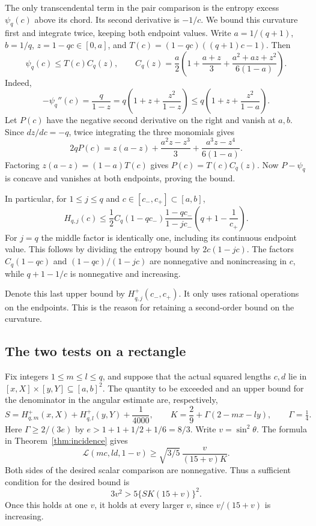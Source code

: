 \documentclass[11pt,a4paper]{article}
\theoremstyle{remark}\newtheorem{remark}[theorem]{Remark}
\numberwithin{equation}{section}
\begin{document}
The only transcendental term in the pair comparison is the entropy
excess $\psi_q(c)$ above its chord. Its second derivative is $-1/c$.
We bound this curvature first and integrate twice, keeping both
endpoint values. Write $a=1/(q+1)$, $b=1/q$,
$z=1-qc\in[0,a]$, and
$T(c)=(1-qc)((q+1)c-1)$. Then
\[
  \psi_q(c)\le T(c)C_q(z),\qquad
  C_q(z)=\frac a2\left(1+\frac{a+z}{3}
          +\frac{a^2+az+z^2}{6(1-a)}\right).
\]
Indeed,
\[
 -\psi_q''(c)=\frac{q}{1-z}
  =q\left(1+z+\frac{z^2}{1-z}\right)
  \le q\left(1+z+\frac{z^2}{1-a}\right).
\]
Let $P(c)$ have the negative second derivative on the right and vanish
at $a,b$. Since $dz/dc=-q$, twice integrating the three monomials
gives
\[
 2qP(c)=z(a-z)+\frac{a^2 z-z^3}{3}
                 +\frac{a^3z-z^4}{6(1-a)} .
\]
Factoring $z(a-z)=(1-a)T(c)$ gives $P(c)=T(c)C_q(z)$.
Now $P-\psi_q$ is concave and vanishes at both endpoints, proving the
bound.

In particular, for $1\le j\le q$ and $c\in[c_-,c_+]\subset[a,b]$,
\[
 H_{q,j}(c)\le
 \frac12 C_q(1-qc_-)
 \frac{1-qc_-}{1-jc_-}\left(q+1-\frac1{c_+}\right).
\]
For $j=q$ the middle factor is identically one, including its
continuous endpoint value. This follows by dividing the entropy bound
by $2c(1-jc)$. The factors $C_q(1-qc)$ and $(1-qc)/(1-jc)$ are nonnegative and
nonincreasing in $c$, while $q+1-1/c$ is nonnegative and increasing.

Denote this last upper bound by \(H^+_{q,j}(c_-,c_+)\). It only uses
rational operations on the endpoints. This is the reason for retaining
a second-order bound on the curvature.

\subsection{The two tests on a rectangle}

Fix integers \(1\le m\le l\le q\), and suppose that the actual squared
lengths \(c,d\) lie in \([x,X]\times[y,Y]\subseteq[a,b]^2\). The
quantity to be exceeded and an upper bound for the denominator in the
angular estimate are, respectively,
\[
 S=H^+_{q,m}(x,X)+H^+_{q,l}(y,Y)+\frac1{4000},
 \qquad K=\frac29+\Gamma(2-mx-ly),\qquad \Gamma=\tfrac14.
\]
Here \(\Gamma\ge 2/(3e)\) by \(e>1+1+1/2+1/6=8/3\). Write
\(v=\sin^2\theta\). The formula in Theorem~\ref{thm:incidence} gives
\[
 \mathcal L(mc,ld,1-v)\ge \sqrt{3/5}\,\frac{v}{(15+v)K}.
\]
Both sides of the desired scalar comparison are nonnegative. Thus a
sufficient condition for the desired bound is
\begin{equation}\label{eq:rational-angle-test}
 3v^2>5\{SK(15+v)\}^2 .
\end{equation}
Once this holds at one \(v\), it holds at every larger \(v\), since
\(v/(15+v)\) is increasing.
\end{document}
